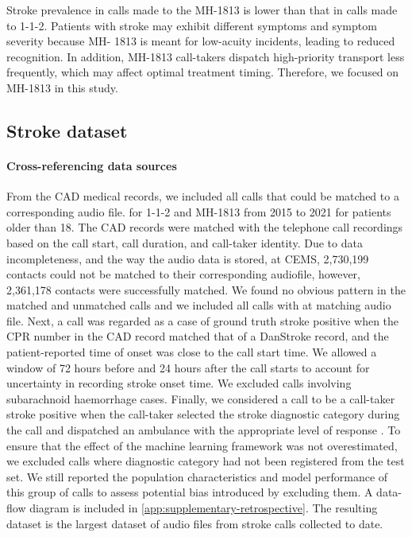 {Stroke prevalence in calls made to the MH-1813 is lower than that in calls made to 1-1-2. Patients with stroke may exhibit different symptoms and symptom severity because MH- 1813 is meant for low-acuity incidents, leading to reduced recognition. In addition, MH-1813 call-takers dispatch high-priority transport less frequently, which may affect optimal treatment timing. Therefore, we focused on MH-1813 in this study.

\subsection{Stroke dataset}

\paragraph{Cross-referencing data sources}

From the CAD medical records, we included all calls that could be matched to a corresponding audio file. for 1-1-2 and MH-1813 from 2015 to 2021 for patients older than 18. The CAD records were matched with the telephone call recordings based on the call start, call duration, and call-taker identity. Due to data incompleteness, and the way the audio data is stored, at CEMS, 2,730,199 contacts could not be matched to their corresponding audiofile, however, 2,361,178 contacts were successfully matched. We found no obvious pattern in the matched and unmatched calls and we included all calls with at matching audio file. Next, a call was regarded as a case of ground truth stroke positive when the CPR number in the CAD record matched that of a DanStroke record, and the patient-reported time of onset was close to the call start time. We allowed a window of 72 hours before and 24 hours after the call starts to account for uncertainty in recording stroke onset time. We excluded calls involving subarachnoid haemorrhage cases. Finally, we considered a call to be a call-taker stroke positive when the call-taker selected the stroke diagnostic category during the call and dispatched an ambulance with the appropriate level of response \parencite{cite20}. To ensure that the effect of the machine learning framework was not overestimated, we excluded calls where diagnostic category had not been registered from the test set. We still reported the population characteristics and model performance of this group of calls to assess potential bias introduced by excluding them. A data-flow diagram is included in \cref{app:supplementary-retrospective}. The resulting dataset is the largest dataset of audio files from stroke calls collected to date.

}
